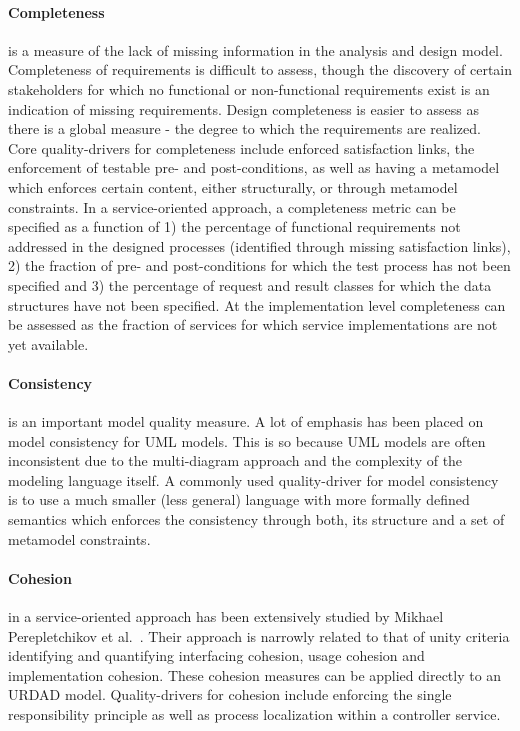 \paragraph{Completeness} is a measure of the lack of missing information in the analysis and design model. Completeness of requirements is difficult to assess, though the discovery of certain stakeholders for which no functional or non-functional requirements exist is an indication of missing requirements. Design completeness is easier to assess as there is a global measure - the degree to which the requirements are realized. Core quality-drivers for completeness include enforced satisfaction links, the enforcement of testable pre- and post-conditions, as well as having a metamodel which enforces certain content, either structurally, or through metamodel constraints. In a service-oriented approach, a completeness metric can be specified as a function of 1) the percentage of functional requirements not addressed in the designed processes (identified through missing satisfaction links)\cite{shim_design_2008}, 2) the fraction of pre- and post-conditions for which the test process has not been specified and 3) the percentage of request and result classes for which the data structures have not been specified. At the implementation level completeness can be assessed as the fraction of services for which service implementations are not yet available.

\paragraph{Consistency} is an important model quality measure. A lot of emphasis has been placed on model consistency for UML models. This is so because UML models are often inconsistent due to the multi-diagram approach and the complexity of the modeling language itself. A commonly used quality-driver for model consistency is to use a much smaller (less general) language with more formally defined semantics which enforces the consistency through both, its structure and a set of metamodel constraints.

\paragraph{Cohesion} in a service-oriented approach has been extensively studied by Mikhael Perepletchikov et al.\ \cite{perepletchikov_cohesion_2007,perepletchikov_impact_2010}. Their approach is narrowly related to that of unity criteria \cite{gonzalez_unity_2009} identifying and quantifying interfacing cohesion, usage cohesion and implementation cohesion. These cohesion measures can be applied directly to an URDAD model. Quality-drivers for cohesion include enforcing the single responsibility principle as well as process localization within a controller service. 

